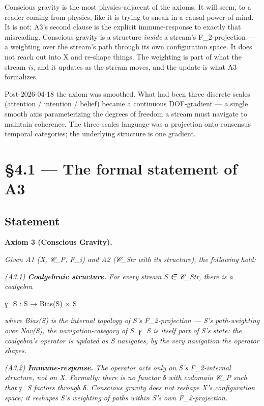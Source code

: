 \documentclass[11pt, openany]{book}
\newcommand{\sectionbreak}{\clearpage}
\begin{document}
Conscious gravity is the most physics-adjacent of the axioms. It will seem, to a reader coming from physics, like it is trying to sneak in a causal-power-of-mind. It is not; A3's second clause is the explicit immune-response to exactly that misreading. Conscious gravity is a structure \textit{inside} a stream's F\_\allowbreak{}2-projection --- a weighting over the stream's path through its own configuration space. It does not reach out into X and re-shape things. The weighting is part of what the stream \textit{is}, and it updates as the stream moves, and the update is what A3 formalizes.

Post-2026-04-18 the axiom was smoothed. What had been three discrete scales (attention / intention / belief) became a continuous DOF-gradient --- a single smooth axis parameterizing the degrees of freedom a stream must navigate to maintain coherence. The three-scales language was a projection onto consensus temporal categories; the underlying structure is one gradient.

\sectionbreak

\section{§4.1 --- The formal statement of A3}

\subsection{Statement}

\textbf{Axiom 3 (Conscious Gravity).}

\textit{Given A1 (X, 𝒞\_\allowbreak{}P, F\_\allowbreak{}i) and A2 (𝒞\_\allowbreak{}Str with its structure), the following hold:}

\textit{(A3.1) \textbf{Coalgebraic structure.} For every stream S ∈ 𝒞\_\allowbreak{}Str, there is a coalgebra}
\begin{Code}
γ_S : S → Bias(S) × S
\end{Code}
\textit{where Bias(S) is the internal topology of S's F\_\allowbreak{}2-projection --- S's path-weighting over Nav(S), the navigation-category of S. γ\_\allowbreak{}S is itself part of S's state: the coalgebra's operator is updated as S navigates, by the very navigation the operator shapes.}

\textit{(A3.2) \textbf{Immune-response.} The operator acts only on S's F\_\allowbreak{}2-internal structure, not on X. Formally: there is no functor δ with codomain 𝒞\_\allowbreak{}P such that γ\_\allowbreak{}S factors through δ. Conscious gravity does not reshape X's configuration space; it reshapes S's weighting of paths within S's own F\_\allowbreak{}2-projection.}
\end{document}
